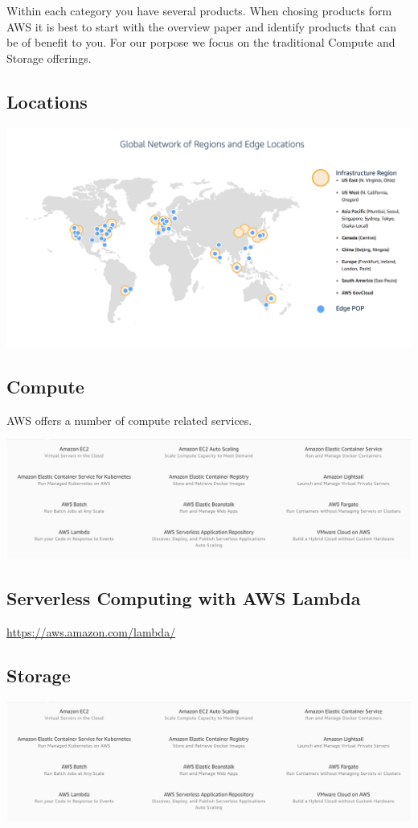 Within each category you have several products. When chosing products
form AWS it is best to start with the overview paper and identify
products that can be of benefit to you. For our porpose we focus on the
traditional Compute and Storage offerings.

\subsection{Locations}

\includegraphics[width=0.8\columnwidth]{images/aws-locations.png}

\subsection{Compute}

AWS offers a number of compute related services.

\includegraphics[width=0.8\columnwidth]{images/aws-compute-list.png}

\subsection{Serverless Computing with AWS Lambda}

\url{https://aws.amazon.com/lambda/}

\subsection{Storage}

\includegraphics[width=0.8\columnwidth]{images/aws-compute-list.png}


